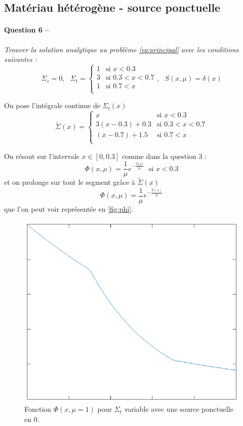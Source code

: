 \documentclass[11pt,a4paper]{article}
\newcommand{\question}[2]{\paragraph{Question #1 --}\hspace{-7pt}\textit{#2} \\}
\newcommand{\intsigma}{\widetilde{\Sigma}}
\begin{document}
\subsection{Matériau hétérogène - source ponctuelle}

\question{6}{Trouver la solution analytique au problème \autoref{eq:principal} avec les conditions suivantes :}

\begin{equation}
  \Sigma_s=0, ~~~
  \Sigma_t =
  \begin{cases}
    1 &\mbox{si } x<0.3 \\
    3 &\mbox{si } 0.3<x<0.7 \\
    1 &\mbox{si } 0.7<x \\
  \end{cases}
  , ~~~ S(x, \mu) = \delta(x)
\end{equation}

On pose l'intégrale continue de $\Sigma_t(x)$ 
\begin{equation}
  \intsigma(x) =
  \begin{cases}
    x &\mbox{si } x<0.3 \\
    3(x-0.3)+0.3 &\mbox{si } 0.3<x<0.7 \\
    (x-0.7)+1.5 &\mbox{si } 0.7<x \\
  \end{cases}
\end{equation}

On résout sur l'intervale $x\in[0,0.3]$ comme dans la question 3 :
\begin{equation}
  \Phi(x, \mu) = \frac{1}{\mu} e^{-\frac{\Sigma_t x)}{\mu}} ~~~ \mbox{si } x<0.3
\end{equation}
et on prolonge sur tout le segment grâce à $\intsigma(x)$ 
\begin{equation}
  \Phi(x, \mu) = \frac{1}{\mu} e^{-\frac{\intsigma(x)}{\mu}} 
\end{equation}
que l'on peut voir représentée en \autoref{fig:phi}.

\begin{figure}
  \centering
  \includegraphics[width=.7\textwidth]{phi}
  \caption{Fonction $\Phi(x, \mu=1)$ pour $\Sigma_t$ variable avec une source ponctuelle en 0.}
  \label{fig:phi}
\end{figure}
\end{document}
